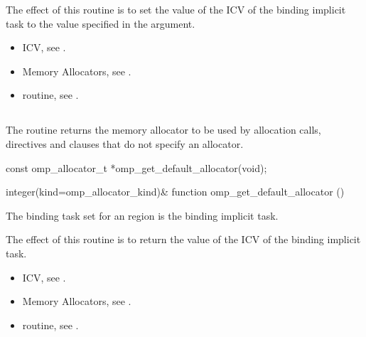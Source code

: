 \effect
The effect of this routine is to set the value of the 
 ICV of the binding implicit task to the value 
specified in the  argument.

\crossreferences
\begin{itemize}
\item {} ICV, see .

\item Memory Allocators, see .

\item {} routine, see .
\end{itemize}



\subsection{}
\label{subsec:omp_get_default_allocator}

\summary
The  routine returns the memory 
allocator to be used by allocation calls,  directives 
and  clauses that do not specify an allocator.

\format
\begin{ccppspecific}
\begin{ompcFunction}
const omp_allocator_t *omp_get_default_allocator(void);
\end{ompcFunction}
\end{ccppspecific}
\begin{fortranspecific}
\begin{ompfFunction}
integer(kind=omp_allocator_kind)&
function omp_get_default_allocator ()
\end{ompfFunction}
\end{fortranspecific}

\binding
The binding task set for an  region 
is the binding implicit task.

\effect
The effect of this routine is to return the value of the 
 ICV of the binding implicit task.

\crossreferences
\begin{itemize}
\item {} ICV, see .

\item Memory Allocators, see .

\item {} routine, see .
\end{itemize}



